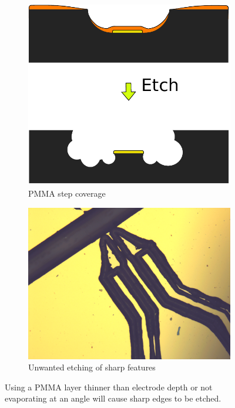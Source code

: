 \documentclass[final]{jyflluk}
\begin{document}
\begin{figure}[h]
    \centering
    \begin{subfigure}[ht]{0.42\textwidth}
        \centering
        \includegraphics[width=\linewidth]{images/pmmacoverage.pdf} 
        \caption{PMMA step coverage} \label{fig:lil}
    \end{subfigure}
    \hfill
    \begin{subfigure}[ht]{0.48\textwidth}
        \centering
        \includegraphics[width=\linewidth]{optical/electrodesideetch.png} 
        \caption{Unwanted etching of sharp features} \label{fig:lell}
    \end{subfigure}
    \caption{Using a PMMA layer thinner than electrode depth or not evaporating at an angle will cause sharp edges to be etched.} \label{fig:coverage}
\end{figure}  
\end{document}
